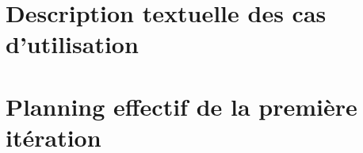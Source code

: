 \documentclass[a4paper,10pt]{article}
\begin{document}
\begin{titlepage}
  
\end{titlepage}
\tableofcontents
\pagebreak



\FloatBarrier
\section{Description textuelle des cas d’utilisation}
  
  
   
   
   

  
\FloatBarrier



\FloatBarrier
\section{Planning effectif de la première itération}
  
\end{document}
